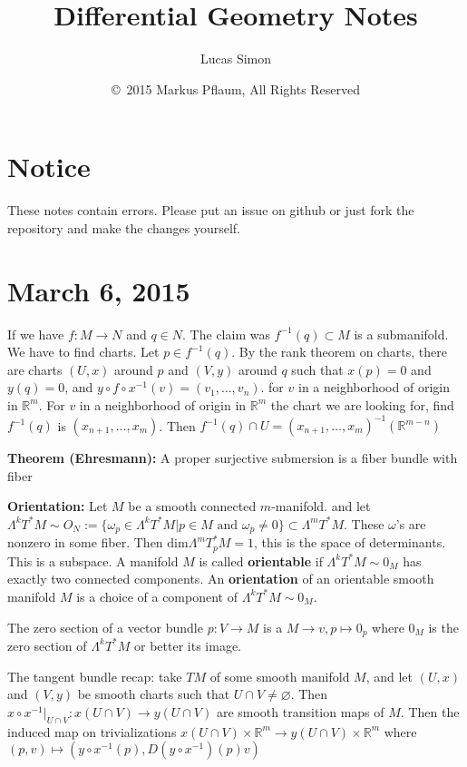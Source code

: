 \documentclass{article}
\title{Differential Geometry Notes}
\author{Lucas Simon}
\date{\copyright\ 2015 Markus Pflaum, All Rights Reserved}
\begin{document}
\maketitle

\section{Notice}
These notes contain errors. Please put an issue on github or just fork the repository and make the changes yourself.

\section{March 6, 2015}

If we have $f:M \to N$ and $q \in N$. The claim was $f^{-1}(q) \subset M$ is a submanifold. We have to find charts. Let $p \in f^{-1}(q)$. By the rank theorem on charts, there are charts $(U, x)$ around $p$ and $(V,y)$ around $q$ such that $x(p) = 0$ and $y(q) = 0$, and $y \circ f \circ x^{-1}(v)=(v_1, \ldots, v_n)$. for $v$ in a neighborhood of origin in $\mathbb{R}^m$. For $v$ in a neighborhood of origin in $\mathbb{R}^m$ the chart we are looking for, find $f^{-1}(q)$ is $(x_{n+1}, \ldots, x_m)$. Then $f^{-1}(q) \cap U = (x_{n+1}, \ldots, x_m)^{-1}(\mathbb{R}^{m-n})$

\textbf{Theorem (Ehresmann):} A proper surjective submersion is a fiber bundle with fiber

\textbf{Orientation:} Let $M$ be a smooth connected $m$-manifold. and let $\Lambda^kT^*M \sim O_N := \{ \omega_p \in \Lambda^kT^*M | p \in M \text{ and } \omega_p \neq 0\} \subset \Lambda^m T^*M$. These $\omega$'s are nonzero in some fiber. Then $\text{dim}\Lambda^m T^*_pM = 1$, this is the space of determinants. This is a subspace. A manifold $M$ is called \textbf{orientable} if $\Lambda^k T^*M \sim 0_M$ has exactly two connected components. An \textbf{orientation} of an orientable smooth manifold $M$ is a choice of a component of $\Lambda^kT^*M \sim 0_M$.

The zero section of a vector bundle $p:V \to M$ is a $M \to v, p \mapsto 0_p$ where $0_M$ is the zero section of $\Lambda^kT^*M$ or better its image. 

The tangent bundle recap: take $TM$ of some smooth manifold $M$, and let $(U,x)$ and $(V,y)$ be smooth charts such that $U \cap V \neq \varnothing$. Then $x \circ x^{-1}|_{U \cap V}:x(U \cap V) \to y(U \cap V)$ are smooth transition maps of $M$. Then the induced map on trivializations $x(U \cap V)\times \mathbb{R}^m \to y(U \cap V)\times \mathbb{R}^m$ where $(p,v) \mapsto (y \circ x^{-1}(p), D(y \circ x^{-1})(p)v)$
\end{document}
